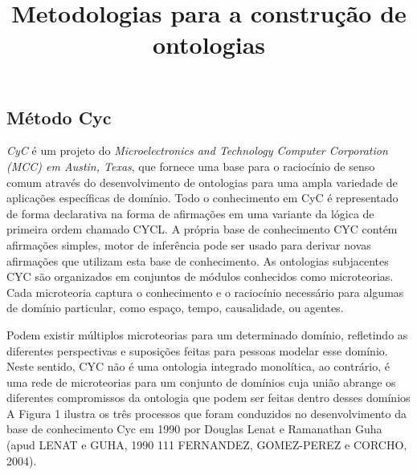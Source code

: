 \documentclass[a4paper]{report}
\title{Metodologias para a construção de ontologias}
\author{}
\date{} %
\begin{document}
\pagestyle{plain}
\maketitle

\subsection{Método Cyc}

\qquad \textit{CyC} é um projeto do \textit{Microelectronics and Technology Computer Corporation (MCC) em Austin, Texas}, que fornece uma base para o raciocínio de senso comum através do desenvolvimento de ontologias para uma ampla variedade de aplicações específicas de domínio. Todo o conhecimento em CyC é representado de forma declarativa na forma de afirmações em uma variante da lógica de primeira ordem chamado CYCL. A própria base de conhecimento CYC contém afirmações simples, motor de inferência pode ser usado para derivar novas afirmações que utilizam esta base de conhecimento.
As ontologias subjacentes CYC são organizados em conjuntos de módulos conhecidos como microteorias. Cada microteoria captura o conhecimento e o raciocínio necessário para algumas de domínio particular, como espaço, tempo, causalidade, ou agentes.

Podem existir múltiplos microteorias para um determinado domínio, refletindo as diferentes perspectivas e suposições feitas para pessoas modelar esse domínio. Neste sentido, CYC não é uma ontologia integrado monolítica, ao contrário, é uma rede de microteorias para um conjunto de domínios cuja união abrange os diferentes compromissos da ontologia que podem ser feitas dentro desses domínios %
	A Figura 1 ilustra os três processos que foram conduzidos no desenvolvimento da
base de conhecimento Cyc em 1990 por Douglas Lenat e Ramanathan Guha (apud LENAT e GUHA, 1990 111 FERNANDEZ, GOMEZ-PEREZ e CORCHO, 2004).
\end{document}

